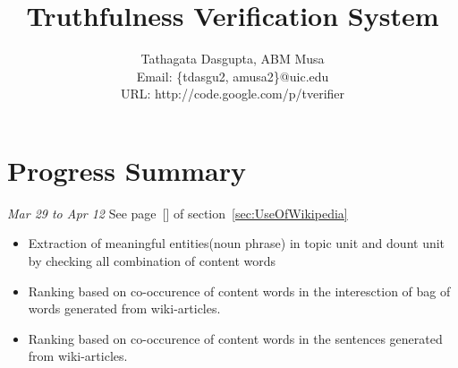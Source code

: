 \documentclass[11pt]{article}
\begin{document}
\title{Truthfulness Verification System}

\author{
Tathagata Dasgupta, ABM Musa\\
Email: \{tdasgu2, amusa2\}@uic.edu\\
URL: http://code.google.com/p/tverifier }

\date{}
\maketitle


\section{Progress Summary}


{\em Mar 29 to Apr 12}
See page~[\pageref{Mar29toApr12}] of section~\ref{sec:UseOfWikipedia}
\begin{itemize}
\item Extraction of meaningful entities(noun phrase) in topic unit and dount unit by checking all combination of content words
\item Ranking based on co-occurence of content words in the interesction of bag of words generated from wiki-articles. 
\item Ranking based on co-occurence of content words in the sentences generated from wiki-articles. 
\end{itemize}
\end{document}
